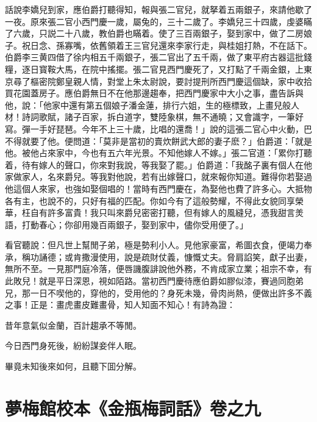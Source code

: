 話說李嬌兒到家，應伯爵打聽得知，報與張二官兒，就拏着五兩銀子，來請他歇了一夜。原來張二官小西門慶一歲，屬兔的，三十二歲了。李嬌兒三十四歲，虔婆瞞了六歲，只説二十八歲，教伯爵也瞞着。使了三百兩銀子，娶到家中，做了二房娘子。祝日念、孫寡嘴，依舊領着王三官兒還來李家行走，與桂姐打熱，不在話下。伯爵李三黄四借了徐内相五千兩銀子，張二官出了五千兩，做了東平府古器這批錢糧，逐日寳鞍大馬，在院中搖擺。張二官見西門慶死了，又打點了千兩金銀，上東京尋了樞密院鄭皇親人情，對堂上朱太尉說，要討提刑所西門慶這個缺，家中收拾買花園蓋房子。應伯爵無日不在他那邊趨奉，把西門慶家中大小之事，盡告訴與他，說：「他家中還有第五個娘子潘金蓮，排行六姐，生的極標致，上畫兒般人材！詩詞歌賦，諸子百家，拆白道字，雙陸象棋，無不通曉；又會識字，一筆好寫。彈一手好琵琶。今年不上三十歲，比唱的還喬！」說的這張二官心中火動，巴不得就要了他。便問道：「莫非是當初的賣炊餅武大郎的妻子麽？」伯爵道：「就是他。被他占來家中，今也有五六年光景。不知他嫁人不嫁。」張二官道：「累你打聽着，待有嫁人的聲口，你來對我說，等我娶了罷。」伯爵道：「我酩子裏有個人在他家做家人，名來爵兒。等我對他說，若有出嫁聲口，就來報你知道。難得你若娶過他這個人來家，也強如娶個唱的！當時有西門慶在，為娶他也費了許多心。大抵物各有主，也說不的，只好有福的匹配。你如今有了這般勢耀，不得此女貌同享榮華，枉自有許多富貴！我只叫來爵兒密密打聽，但有嫁人的風縫兒，憑我甜言羙語，打動春心；你卻用幾百兩銀子，娶到家中，儘你受用便了。」

看官聽說：但凡世上幫閒子弟，極是勢利小人。見他家豪富，希圖衣食，便竭力奉承，稱功誦德；或肯撒漫使用，說是疏財仗義，慷慨丈夫。脅肩諂笑，獻子出妻，無所不至。一見那門庭冷落，便唇譏腹誹說他外務，不肯成家立業；祖宗不幸，有此敗兒！就是平日深恩，視如陌路。當初西門慶待應伯爵如膠似漆，賽過同胞弟兄，那一日不喫他的，穿他的，受用他的？身死未幾，骨肉尚熱，便做出許多不義之事！正是：畫虎畫皮難畫骨，知人知面不知心！有詩為證：

\begin{myquote}
昔年意氣似金蘭，百計趨承不等閒。

今日西門身死後，紛紛謀妾伴人眠。
\end{myquote}

畢竟未知後來如何，且聽下囬分解。

\part*{夢梅館校本《金瓶梅詞話》卷之九}

